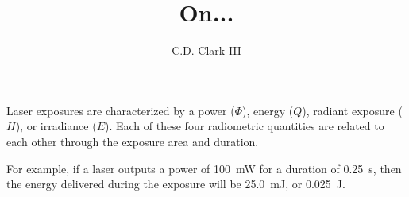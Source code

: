 \documentclass[]{article}
\author{C.D. Clark III}
\title{On...}
\begin{document}
\maketitle



Laser exposures are characterized by a power ($\Phi$), energy ($Q$), radiant exposure ($H$),
or irradiance ($E$). Each of these four radiometric quantities are related to each other
through the exposure area and duration.


For example, if a laser outputs a power of \SI[]{100}{\milli\watt} for a
duration of \SI[]{0.25}{\second}, then the energy delivered during the
exposure will be \SI[]{25.0}{\milli\joule}, or \SI[]{0.025}{\joule}.
\end{document}
